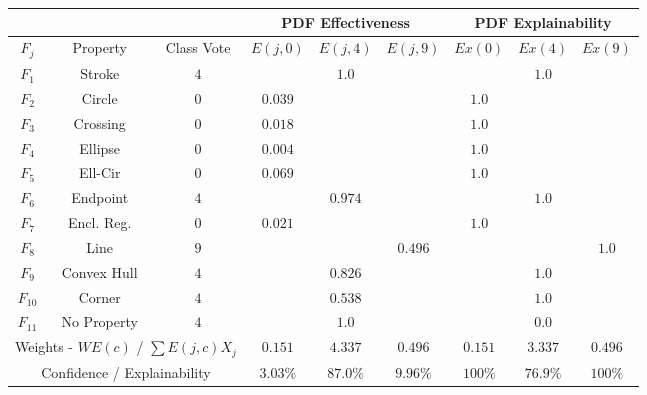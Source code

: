 \begin{table}[h!]
        \renewcommand{\arraystretch}{1.3}
        \label{table:mnist_example1_ex}
        \begin{center}
        \begin{tabular}{| c | c | c | c | c | c || c | c | c |}
        \cline{4-9}
        \multicolumn{3}{c}{} & \multicolumn{3}{|c||}{PDF Effectiveness} & \multicolumn{3}{c|}{PDF Explainability} \\
        \hline
        $F_j$ & Property & Class Vote & $E(j,0)$ & $E(j,4)$ & $E(j,9)$ & $Ex(0)$ & $Ex(4)$ & $Ex(9)$ \\
        \hline
        \hline
        $F_1$ & Stroke & $4$ &  & $1.0$ &  &  & $1.0$ & \\ 
        \hline
        $F_2$ & Circle & $0$ & $0.039$ &  &  & $1.0$ &  & \\
        \hline
        $F_3$ & Crossing & $0$ & $0.018$ &  &  & $1.0$ &  & \\
        \hline
        $F_4$ & Ellipse & $0$ & $0.004$ &  &  & $1.0$ &  & \\
        \hline
        $F_5$ & Ell-Cir & $0$ & $0.069$ &  &  & $1.0$ &  & \\
        \hline
        $F_6$ & Endpoint & $4$ &  & $0.974$ &  &  & $1.0$ & \\
        \hline
        $F_7$ & Encl. Reg. & $0$ & $0.021$ &  &  & $1.0$ &  & \\
        \hline
        $F_8$ & Line & $9$ &  &  & $0.496$ &  &  & $1.0$ \\
        \hline
        $F_9$& Convex Hull & $4$ &  & $0.826$ &  &  & $1.0$ & \\
        \hline
        $F_{10}$& Corner & $4$ &  & $0.538$ &  &  & $1.0$ & \\
        \hline
        $F_{11}$& No Property & $4$ &  & $1.0$ &  &  & $0.0$ & \\
        \hline
        \hline
        \multicolumn{3}{|c|}{Weights - $WE(c)$ / $\sum E(j,c)X_j$} & $0.151$ & $4.337$ & $0.496$ & $0.151$ & $3.337$ & $0.496$ \\
        \cline{0-8}
        \multicolumn{3}{|c|}{Confidence / Explainability} & $3.03\%$ & $87.0\%$ & $9.96\%$ & $100\%$ & $76.9\%$ & $100\%$ \\
        \cline{0-8}
        \end{tabular}
        \end{center}
\end{table}

